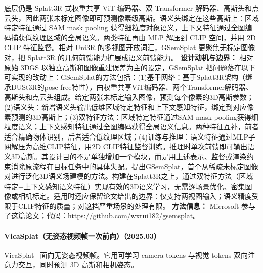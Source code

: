 底层仍是 Splatt3R 式权重共享 ViT 编码器、双 Transformer 解码器、高斯头和点云头，因此两张未标定图像即可预测像素级高斯。语义头绑定在这些高斯上：区域特定特征通过 SAM mask pooling 获得细粒度对象语义，上下文特征通过全图编码捕获低纹理区域的全局语义。两类特征再由 MLP 解压到 CLIP 空间，并用 2D CLIP 特征监督。相对 Uni3R 的多视图开放词汇，GSemSplat 更聚焦无标定图像对，把 Splatt3R 的几何前馈能力扩展成语义前馈能力。
\textbf{设计动机与边界：} 相对原始 3DGS 以独立高斯和图像重建误差为主的设定，GSemSplat 把问题落在以下可实现的改动上：GSemSplat的方法包括：(1)基干网络：基于Splatt3R架构（继承DUSt3R的pose-free特性），由权重共享ViT编码器、两个Transformer解码器、高斯头和点云头组成。给定两张未标定输入图像，预测每个像素的3D高斯参数；(2)语义头：新增语义头输出低维区域特定特征和上下文感知特征，绑定到对应像素预测的3D高斯上；(3)双特征方法：区域特定特征通过SAM mask pooling获得细粒度语义；上下文感知特征通过全图编码获得全局语义信息。两种特征互补，前者适合精确物体识别，后者适合低纹理区域；(4)训练与推理：语义特征通过MLP子网解压为高维CLIP特征，用2D CLIP特征监督训练。推理时单次前馈即可输出语义3D高斯。其设计目的不是单独增加一个模块，而是用上述表示、监督或渲染约束消除原流程在目标任务中的具体失配。提出GSemSplat，首个从稀疏未标定图像对进行泛化3D语义场建模的方法。构建在Splatt3R之上，通过双特征方法（区域特定+上下文感知语义特征）实现有效的3D语义学习，无需逐场景优化、密集图像或相机标定。适用时还应保留论文给出的边界：仅支持两视图输入；语义精度受限于CLIP特征的质量；对遮挡严重场景的处理有限。
\textbf{方法信息：} Microsoft 参与了这篇论文；代码：\url{https://github.com/wxrui182/gsemsplat}。



\paragraph{VicaSplat（无姿态视频帧一次前向）（2025.03）}
VicaSplat~\cite{2503_10286} 面向无姿态视频帧。它用可学习 camera tokens 与视觉 tokens 双向注意力交互，同时预测 3D 高斯和相机姿态。

